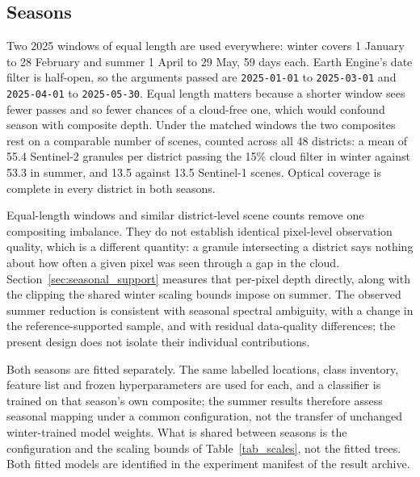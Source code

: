 \documentclass[conference]{IEEEtran}
\begin{document}
\subsection{Seasons}
\label{sec:seasons}
Two 2025 windows of equal length are used everywhere: winter covers 1 January to 28 February and summer 1 April to 29 May, 59 days each. Earth Engine's date filter is half-open, so the arguments passed are \texttt{2025-01-01} to \texttt{2025-03-01} and \texttt{2025-04-01} to \texttt{2025-05-30}. Equal length matters because a shorter window sees fewer passes and so fewer chances of a cloud-free one, which would confound season with composite depth. Under the matched windows the two composites rest on a comparable number of scenes, counted across all 48 districts: a mean of 55.4 Sentinel-2 granules per district passing the 15\% cloud filter in winter against 53.3 in summer, and 13.5 against 13.5 Sentinel-1 scenes. Optical coverage is complete in every district in both seasons.

Equal-length windows and similar district-level scene counts remove one compositing imbalance. They do not establish identical pixel-level observation quality, which is a different quantity: a granule intersecting a district says nothing about how often a given pixel was seen through a gap in the cloud. Section~\ref{sec:seasonal_support} measures that per-pixel depth directly, along with the clipping the shared winter scaling bounds impose on summer. The observed summer reduction is consistent with seasonal spectral ambiguity, with a change in the reference-supported sample, and with residual data-quality differences; the present design does not isolate their individual contributions.

Both seasons are fitted separately. The same labelled locations, class inventory, feature list and frozen hyperparameters are used for each, and a classifier is trained on that season's own composite; the summer results therefore assess seasonal mapping under a common configuration, not the transfer of unchanged winter-trained model weights. What is shared between seasons is the configuration and the scaling bounds of Table~\ref{tab_scales}, not the fitted trees. Both fitted models are identified in the experiment manifest of the result archive.
\end{document}
